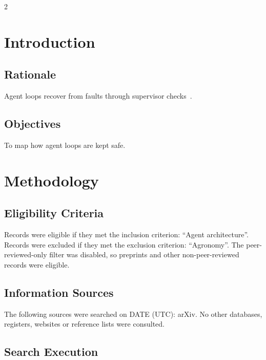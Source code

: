 \documentclass[10pt,a4paper]{article}
\begin{document}
\begin{multicols}{2}

\section{Introduction}\label{sec:introduction}

\subsection{Rationale}\label{sec:rationale}

Agent loops recover from faults through supervisor checks~\cite{doe2025agent}.

\subsection{Objectives}\label{sec:objectives}

To map how agent loops are kept safe.

\section{Methodology}\label{sec:methodology}

\subsection{Eligibility Criteria}\label{sec:eligibility-criteria}

Records were eligible if they met the inclusion criterion: ``Agent architecture''.
Records were excluded if they met the exclusion criterion: ``Agronomy''.
The peer-reviewed-only filter was disabled, so preprints and other non-peer-reviewed records were eligible.

\subsection{Information Sources}\label{sec:information-sources}

The following sources were searched on DATE (UTC): arXiv.
No other databases, registers, websites or reference lists were consulted.

\subsection{Search Execution}\label{sec:search-execution}


\end{multicols}
\end{document}
